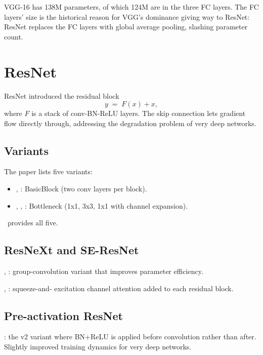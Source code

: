 VGG-16 has 138M parameters, of which 124M are in the three FC
layers. The FC layers' size is the historical reason for VGG's
dominance giving way to ResNet: ResNet replaces the FC layers
with global average pooling, slashing parameter count.

\section{ResNet}
\label{sec:vision_cnn:resnet}

ResNet \cite{he_resnet_2016} introduced the residual block
\[
y \;=\; F(x) + x,
\]
where $F$ is a stack of conv-BN-ReLU layers. The skip connection
lets gradient flow directly through, addressing the degradation
problem of very deep networks.

\subsection{Variants}
\label{ssec:vision_cnn:resnet_variants}

The paper lists five variants:
\begin{itemize}
  \item {}, : BasicBlock (two
    conv layers per block).
  \item {}, , :
    Bottleneck (1x1, 3x3, 1x1 with channel expansion).
\end{itemize}

\Lucid\ provides all five.

\subsection{ResNeXt and SE-ResNet}
\label{ssec:vision_cnn:resnext}

, : group-convolution
variant that improves parameter efficiency.

, : squeeze-and-
excitation channel attention added to each residual block.

\subsection{Pre-activation ResNet}
\label{ssec:vision_cnn:preact}

: the v2 variant where BN+ReLU is
applied before convolution rather than after. Slightly improved
training dynamics for very deep networks.

